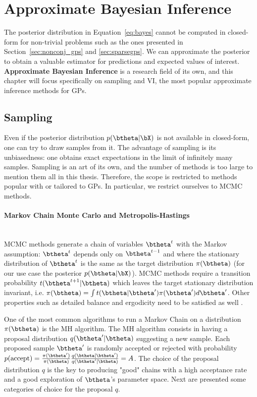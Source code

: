 \section{Approximate Bayesian Inference}
\label{sec:approx_inf}

The posterior distribution in Equation~\eqref{eq:bayes} cannot be computed in closed-form for non-trivial problems such as the ones presented in Section~\ref{sec:nonconj_gps} and \ref{sec:sparsegps}.
We can approximate the posterior to obtain a valuable estimator for predictions and expected values of interest.
\textbf{Approximate Bayesian Inference} is a research field of its own, and this chapter will focus specifically on sampling and \acl{VI}, the most popular approximate inference methods for \ac{GPs}.

\subsection{Sampling}

Even if the posterior distribution $p(\btheta|\bX)$ is not available in closed-form, one can try to draw samples from it.
The advantage of sampling is its unbiasedness: one obtains exact expectations in the limit of infinitely many samples.
Sampling is an art of its own, and the number of methods is too large to mention them all in this thesis.
Therefore, the scope is restricted to methods popular with or tailored to \ac{GPs}.
In particular, we restrict ourselves to \ac{MCMC} methods.

\paragraph{Markov Chain Monte Carlo and Metropolis-Hastings}\mbox{}\\
\acf{MCMC} methods generate a chain of variables $\btheta^t$ with the Markov assumption: $\btheta^t$ depends only on $\btheta^{t-1}$ and where the stationary distribution of $\btheta^t$ is the same as the target distribution $\pi(\btheta)$ (for our use case the posterior $p(\btheta|\bX)$).
\ac{MCMC} methods require a transition probability $t(\btheta^{t+1}|\btheta)$ which leaves the target stationary distribution invariant, i.e. $\pi(\btheta) = \int t(\btheta|\btheta')\pi(\btheta')d\btheta'$.
Other properties such as detailed balance and ergodicity need to be satisfied as well \cite{brooks2011handbook, o2004kendall}.

One of the most common algorithms to run a Markov Chain on a distribution $\pi(\btheta)$ is the \acf{MH} algorithm.
The \ac{MH} algorithm consists in having a proposal distribution $q(\btheta'|\btheta)$ suggesting a new sample.
Each proposed sample $\btheta'$ is randomly accepted or rejected with probability $p(\text{accept}) = \frac{\pi(\btheta')}{\pi(\btheta)}\frac{q(\btheta|\btheta')}{q(\btheta'|\btheta)} = A$.
The choice of the proposal distribution $q$ is the key to producing "good" chains with a high acceptance rate and a good exploration of $\btheta$'s parameter space.
Next are presented some categories of choice for the proposal $q$.


